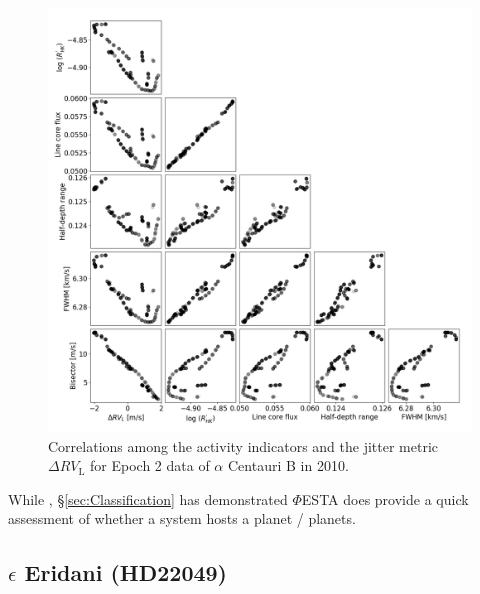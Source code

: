 \begin{figure}[tbp]
\centering
\includegraphics[width = 1.0 \linewidth]
{./Figures/Methods/Correlogram_indicator.png}
\caption[Correlations among the activity indicators and the jitter metric]
		{Correlations among the activity indicators and the jitter metric $\Delta RV_\text{L}$ for Epoch 2 data of  $\alpha$ Centauri B in 2010.}
\label{fig:Correlogram_indicator}
\end{figure} 




While , \S\ref{sec:Classification} has demonstrated $\mathit{\Phi}$ESTA does provide a quick assessment of whether a system hosts a planet / planets. 





\subsection{$\epsilon$ Eridani (HD22049)}

